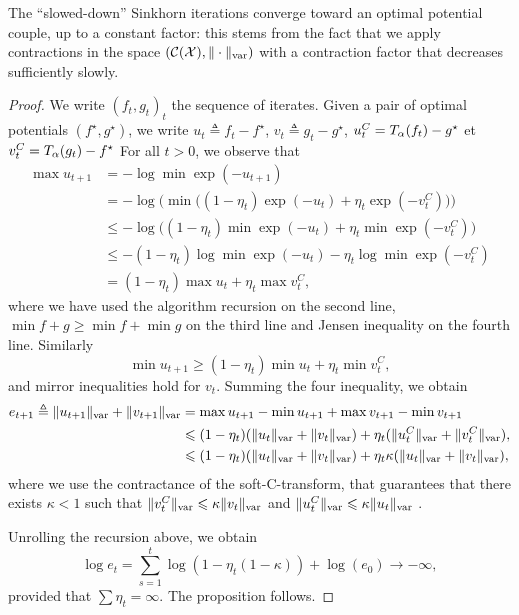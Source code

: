 The \enquote{slowed-down} Sinkhorn iterations converge toward an optimal
potential couple, up to a constant factor: this stems from the fact that we
apply contractions in the space $(\mathcal{C}(\mathcal{X}), \Vert\cdot\Vert_{\text{var}})$ with a
contraction factor that decreases sufficiently slowly.
\begin{proof}
    We write ${(f_t, g_t)}_t$ the sequence of iterates. Given a pair of optimal potentials 
    $(f^\star, g^\star)$, we write $u_t \triangleq f_t - f^\star$, $v_t \triangleq g_t - g^\star$,
    $u_t^C = T_{\alpha}(f_t) - g^\star$ et $v_t^C = T_{\alpha}(g_t) - f^\star$
    For all $t > 0$, we observe that 
    \begin{align}
        \max u_{t+1} &= - \log \min \exp(-u_{t+1}) \\
        &= - \log \big( \min \big( (1 - \eta_t) \exp(-u_{t}) + \eta_t 
        \exp(-v_t^C) \big) \big)\\
        &\leq - \log \big( (1 - \eta_t) \min \exp(-u_{t}) + \eta_t 
        \min \exp(-v_t^C) \big)\\
        &\leq - (1 - \eta_t) \log \min \exp(-u_{t}) -  \eta_t \log \min
         \exp(-v_t^C) \\
         &= (1 - \eta_t) \max u_t  + \eta_t \max v_t^C,
    \end{align}
    where we have used the algorithm recursion on the second line, $\min f + g \geq \min f + \min g$
     on the third line and Jensen inequality on the fourth line. Similarly
    \begin{equation}
        \min u_{t+1} \geq (1 - \eta_t) \min u_t  + \eta_t \min v_t^C,
    \end{equation}
    and mirror inequalities hold for $v_t$. Summing the four inequality, we obtain
    \begin{align}\label{eq:et}
        e_{t+1} \triangleq \Vert u_{t+1} \Vert_{\text{var}} + \Vert v_{t+1} \Vert_{\text{var}} 
        &= \max u_{t+1} - \min u_{t+1} + \max v_{t+1} - \min v_{t+1} \\
        &\leqslant
        (1 - \eta_t) ( \Vert u_t \Vert_{\text{var}} + \Vert v_t \Vert_{\text{var}})
        + \eta_t ( \Vert u_t^C \Vert_{\text{var}} + \Vert v_t^C \Vert_{\text{var}}), \\
        &\leqslant
        (1 - \eta_t) ( \Vert u_t \Vert_{\text{var}} + \Vert v_t \Vert_{\text{var}})
        + \eta_t \kappa ( \Vert u_t \Vert_{\text{var}} + \Vert v_t \Vert_{\text{var}}),
    \end{align}
    where we use the contractance of the soft-C-transform, that guarantees that
    there exists $\kappa < 1$ such that $\Vert v_t^C\Vert_{\text{var}} \leqslant \kappa \Vert
    v_t\Vert_{\text{var}}$ and $\Vert u_t^C\Vert_{\text{var}} \leqslant \kappa \Vert
    u_t\Vert_{\text{var}}$ \citep{peyre2019computational}.

    Unrolling the recursion above, we obtain
    \begin{equation}
        \log e_t = \sum_{s=1}^t \log(1 - \eta_t (1 - \kappa)) + \log(e_0) \to - \infty,
    \end{equation}
    provided that $\sum \eta_t = \infty$. The proposition follows.
\end{proof}

